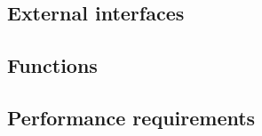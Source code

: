 \documentclass{article}
\begin{document}
\subsection{External interfaces}


\subsection{Functions}



\subsection{Performance requirements}

\end{document}
